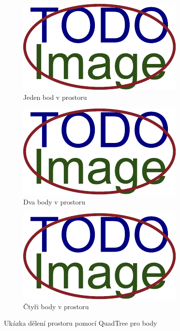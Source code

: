 \begin{figure}[H]
	\centering
	\begin{subfigure}{0.32\textwidth}
		\includegraphics[width=\textwidth]{obrazky-figures/placeholder.pdf}
		\caption{Jeden bod v prostoru}
		\label{fig:silnice:quadtree:1}
	\end{subfigure}
	\hfill
	\begin{subfigure}{0.32\textwidth}
		\includegraphics[width=\textwidth]{obrazky-figures/placeholder.pdf}
		\caption{Dva body v prostoru}
		\label{fig:silnice:quadtree:2}
	\end{subfigure}
	\hfill
	\begin{subfigure}{0.32\textwidth}
		\includegraphics[width=\textwidth]{obrazky-figures/placeholder.pdf}
		\caption{Čtyři body v prostoru}
		\label{fig:silnice:quadtree:4}
	\end{subfigure}
	\caption{Ukázka dělení prostoru pomocí QuadTree pro body}
	\label{fig:silnice:quadtree}
\end{figure}

